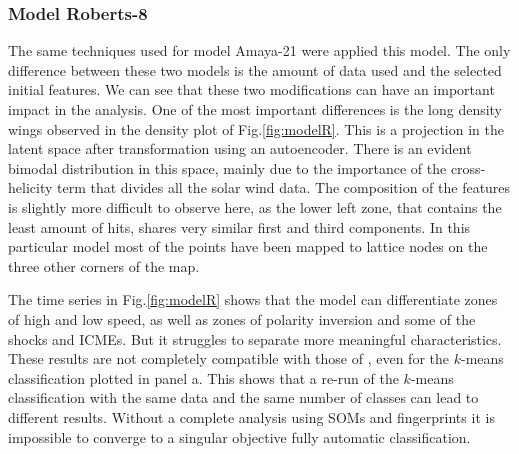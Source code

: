 \subsubsection{Model Roberts-8}
The same techniques used for model Amaya-21 were applied this model. The only difference between these two models is the amount of data used and the selected initial features. We can see that these two modifications can have an important impact in the analysis. One of the most important differences is the long density wings observed in the density plot of Fig.\ref{fig:modelR}. This is a projection in the latent space after transformation using an autoencoder. There is an evident bimodal distribution in this space, mainly due to the importance of the cross-helicity term that divides all the solar wind data. The composition of the features is slightly more difficult to observe here, as the lower left zone, that contains the least amount of hits, shares very similar first and third components. In this particular model most of the points have been mapped to lattice nodes on the three other corners of the map.

The time series in Fig.\ref{fig:modelR} shows that the model can differentiate zones of high and low speed, as well as zones of polarity inversion and some of the shocks and ICMEs. But it struggles to separate more meaningful characteristics. These results are not completely compatible with those of \citep{Roberts2020}, even for the $k$-means classification plotted in panel a. This shows that a re-run of the $k$-means classification with the same data and the same number of classes can lead to different results. Without a complete analysis using SOMs and fingerprints it is impossible to converge to a singular objective fully automatic classification.